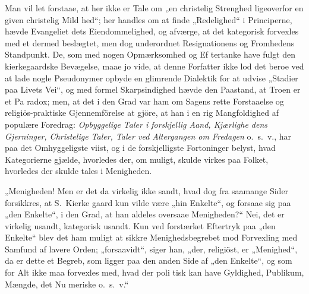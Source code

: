 \documentclass[12pt,a4paper]{article}
\newcommand{\opage}[1]{\marginnote{\footnotesize\textit{[#1]}}}
\begin{document}
Man vil let forstaae, at her ikke er Tale om „en
christelig Strenghed ligeoverfor en given christelig Mild\-%
hed“; her handles om at finde „Redelighed“ i Principerne,
hævde Evangeliet dets Eiendommelighed, og afværge,
at det kategorisk forvexles med et dermed beslægtet,
men dog underordnet Resignationens og Fromhedens
Standpunkt. De, som med nogen Opmærksomhed og Ef\-%
tertanke have fulgt den kierkegaardske Bevægelse, maae
jo vide, at denne Forfatter ikke lod det beroe ved at
lade nogle Pseudonymer opbyde en glimrende Dialektik
for at udvise „Stadier paa Livets Vei“, og med formel
Skarpsindighed hævde den Paastand, at Troen er et Pa\-%
radox; men, at det i den Grad var ham om Sagens rette
\opage{11} %
Forstaaelse og religiös-praktiske Gjennemförelse at gjöre,
at han i en rig Mangfoldighed af populære Foredrag:
\emph{Opbyggelige Taler i forskjellig Aand, Kjærlighe\-%
dens Gjerninger, Christelige Taler, Taler ved
Altergangen om Fredagen} o.\ s.\ v., har paa det
Omhyggeligste viist, og i de forskjelligste Fortoninger
belyst, hvad Kategorierne gjælde, hvorledes der, om
muligt, skulde virkes paa Folket, hvorledes der skulde
tales i Menigheden.

„Menigheden! Men er det da virkelig ikke sandt,
hvad dog fra saamange Sider forsikkres, at S.\ Kierke\-%
gaard kun vilde være „hin Enkelte“, og forsaae sig paa
„den Enkelte“, i den Grad, at han aldeles oversaae
Menigheden?“ Nei, det er virkelig usandt, kategorisk
usandt. Kun ved forstærket Eftertryk paa „den Enkelte“
blev det ham muligt at sikkre Menighedsbegrebet mod
Forvexling med Samfund af lavere Orden; „forsaavidt“,
siger han, „der, religiöst, er „Menighed“, da er dette et
Begreb, som ligger paa den anden Side af „den Enkelte“,
og som for Alt ikke maa forvexles med, hvad der poli\-%
tisk kan have Gyldighed, Publikum, Mængde, det Nu\-%
meriske o.\ s.\ v.“
\end{document}
